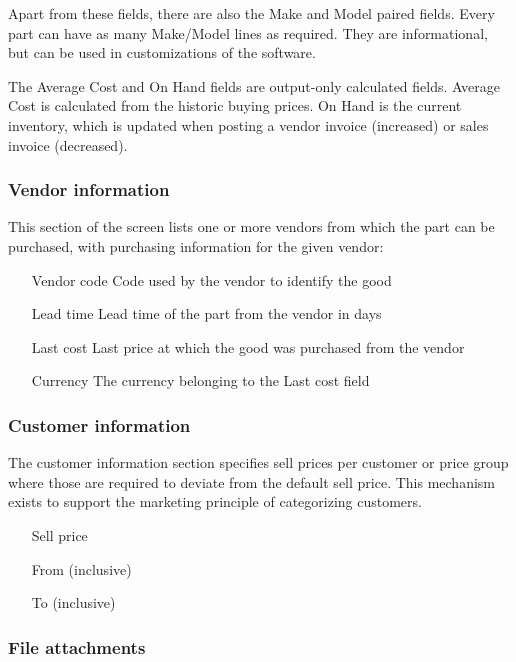 Apart from these fields, there are also the Make and Model paired fields. Every part
can have as many Make/Model lines as required. They are informational, but can be used
in customizations of the software.

The Average Cost and On Hand fields are output-only calculated fields. Average Cost is
calculated from the historic buying prices. On Hand is the current inventory, which is
updated when posting a vendor invoice (increased) or sales invoice (decreased).


\subsubsection{Vendor information}

This section of the screen lists one or more vendors from which the part can be
purchased, with purchasing information for the given vendor:

\begin{itemize}
\item [Vendor code] Code used by the vendor to identify the good
\item [Lead time] Lead time of the part from the vendor in days
\item [Last cost] Last price at which the good was purchased from the vendor
\item [Currency] The currency belonging to the Last cost field
\end{itemize}

\subsubsection{Customer information}

The customer information section specifies sell prices per customer or price group
where those are required to deviate from the default sell price. This mechanism exists
to support the marketing principle of categorizing customers.

\begin{itemize}
\item [Sell price]
\item [From] (inclusive)
\item [To] (inclusive)
\end{itemize}

\subsubsection{File attachments}

